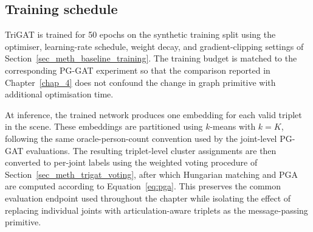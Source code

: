 \subsection{Training schedule}
\label{sec_meth_trigat_training}

TriGAT is trained for 50 epochs on the synthetic training split
using the optimiser,
learning-rate schedule,
weight decay,
and gradient-clipping settings of
Section~\ref{sec_meth_baseline_training}.
The training budget is matched to the corresponding PG-GAT experiment
so that the comparison reported in Chapter~\ref{chap_4}
does not confound the change in graph primitive
with additional optimisation time.

At inference,
the trained network produces one embedding for each valid triplet
in the scene.
These embeddings are partitioned using $k$-means with $k=K$,
following the same oracle-person-count convention used by
the joint-level PG-GAT evaluations.
The resulting triplet-level cluster assignments are then converted
to per-joint labels using the weighted voting procedure of
Section~\ref{sec_meth_trigat_voting},
after which Hungarian matching and PGA are computed
according to Equation~\eqref{eq:pga}.
This preserves the common evaluation endpoint used throughout
the chapter
while isolating the effect of replacing individual joints
with articulation-aware triplets as the message-passing primitive.